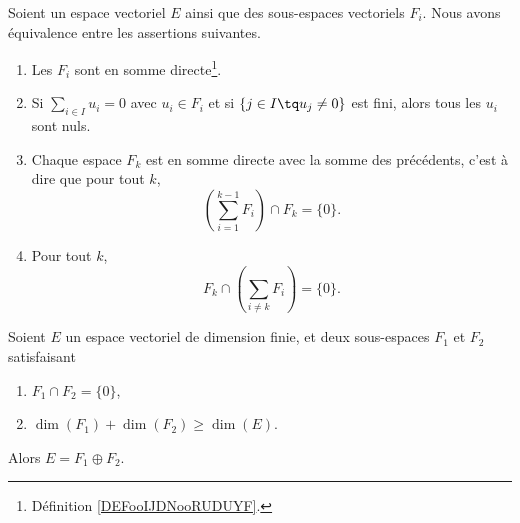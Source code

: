 \begin{lemma}         \label{LEMooDQMQooInVVDY}
	Soient un espace vectoriel \( E\) ainsi que des sous-espaces vectoriels \( F_i\). Nous avons équivalence entre les assertions suivantes.

	\begin{enumerate}
		\item
		      Les \( F_i\) sont en somme directe\footnote{Définition \ref{DEFooIJDNooRUDUYF}.}.
		\item
		      Si \( \sum_{i\in I}u_i=0\) avec \( u_i\in F_i\) et si \( \{ j\in I\tq u_j\neq 0 \}\) est fini, alors tous les \( u_i\) sont nuls.
		\item
		      Chaque espace \( F_k\) est en somme directe avec la somme des précédents, c'est à dire que pour tout \( k\),
		      \begin{equation}
			      \left( \sum_{i=1}^{k-1}F_i \right)\cap F_k=\{ 0 \}.
		      \end{equation}
		\item   \label{ITEMooPLXGooCOQgen}
		      Pour tout \( k\),
		      \begin{equation}
			      F_k\cap\left( \sum_{i\neq k}F_i \right)=\{ 0 \}.
		      \end{equation}
	\end{enumerate}
\end{lemma}

\begin{proposition}               \label{PROPooCASNooEqisqa}
	Soient \( E\) un espace vectoriel de dimension finie, et deux sous-espaces \( F_1\) et \( F_2\) satisfaisant
	\begin{enumerate}
		\item
		      \( F_1\cap F_2=\{ 0 \}\),
		\item
		      \( \dim(F_1)+\dim(F_2)\geq \dim(E)\).
	\end{enumerate}
	Alors \( E=F_1\oplus F_2\).
\end{proposition}

